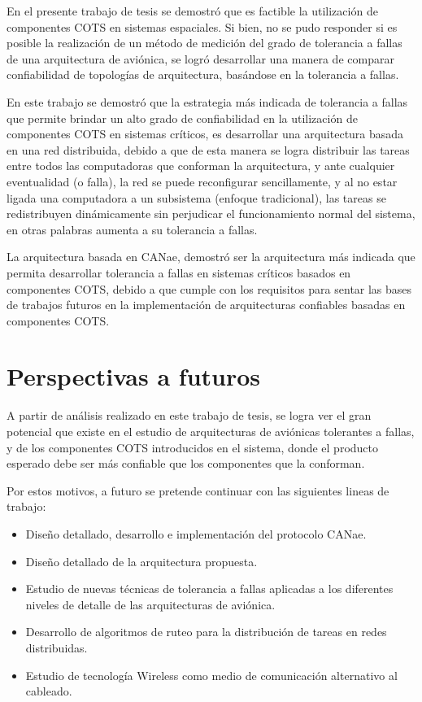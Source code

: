 En el presente trabajo de tesis se demostró que es factible la utilización de
componentes COTS en sistemas espaciales. Si bien, no se pudo responder si es
posible la realización de un método de medición del grado de tolerancia a
fallas de una arquitectura de aviónica, se logró desarrollar una manera
de comparar confiabilidad de topologías de arquitectura, basándose en la
tolerancia a fallas.

En este trabajo se demostró que la estrategia más indicada de tolerancia a
fallas que permite brindar un alto grado de confiabilidad en la utilización de
componentes COTS en sistemas críticos, es desarrollar una arquitectura basada en
una red distribuida, debido a que de esta manera se logra distribuir las tareas
entre todos las computadoras que conforman la arquitectura,
y ante cualquier eventualidad (o falla), la red se puede reconfigurar sencillamente,
y al no estar ligada una computadora a un subsistema (enfoque tradicional), las tareas
se redistribuyen dinámicamente sin perjudicar el funcionamiento normal
del sistema, en otras palabras aumenta a su tolerancia a fallas.

La arquitectura basada en CANae, demostró ser la arquitectura más indicada que permita
desarrollar tolerancia a fallas en sistemas críticos basados en componentes COTS,
debido a que cumple con los requisitos para sentar las bases de trabajos futuros
en la implementación de arquitecturas confiables basadas en componentes COTS. 

\section{Perspectivas a futuros}\label{chap:TrabajosFuturos}
A partir de análisis realizado en este trabajo de tesis, se logra ver el gran
potencial que existe en el estudio de arquitecturas de aviónicas tolerantes
a fallas, y de los componentes COTS introducidos en el sistema,
donde el producto esperado debe ser más confiable que los componentes
que la conforman.

Por estos motivos, a futuro se pretende continuar con las siguientes lineas de trabajo:
\begin{itemize}
\item Diseño detallado, desarrollo e implementación del protocolo CANae.
\item Diseño detallado de la arquitectura propuesta.
\item Estudio de nuevas técnicas de tolerancia a fallas aplicadas a los diferentes niveles
de detalle de las arquitecturas de aviónica.
\item Desarrollo de algoritmos de ruteo para la distribución de tareas en redes distribuidas.
\item Estudio de tecnología Wireless como medio de comunicación alternativo al cableado.
\end{itemize}

